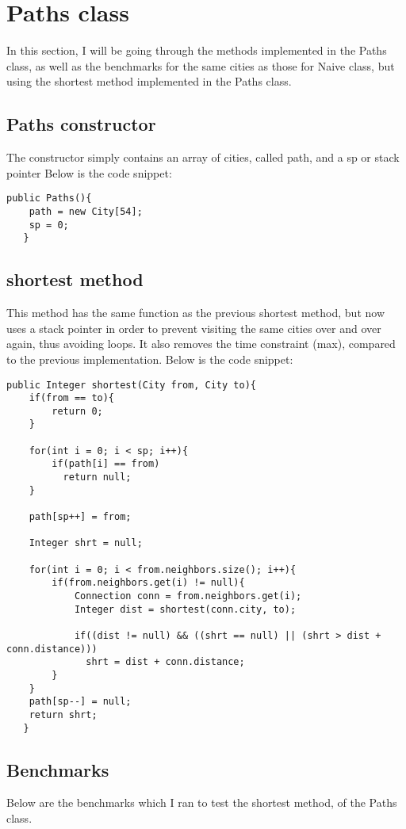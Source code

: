 \documentclass[a4paper,11pt]{article}
\begin{document}
\section*{Paths class}
In this section, I will be going through the methods implemented in the Paths class, as well as the benchmarks for the same cities as those for Naive class, but using the shortest method implemented in the Paths class.


\subsection*{Paths constructor}
The constructor simply contains an array of cities, called path, and a sp or stack pointer Below is the code snippet:

\begin{verbatim}
public Paths(){
    path = new City[54];
    sp = 0;
   }
\end{verbatim}

\subsection*{shortest method}
This method has the same function as the previous shortest method, but now uses a stack pointer in order to prevent visiting the same cities over and over again, thus avoiding loops. It also removes the time constraint (max), compared to the previous implementation. Below is the code snippet:

\begin{verbatim}
public Integer shortest(City from, City to){
    if(from == to){
        return 0;
    }

    for(int i = 0; i < sp; i++){
        if(path[i] == from)
          return null;
    }

    path[sp++] = from;

    Integer shrt = null;

    for(int i = 0; i < from.neighbors.size(); i++){
        if(from.neighbors.get(i) != null){
            Connection conn = from.neighbors.get(i);
            Integer dist = shortest(conn.city, to);

            if((dist != null) && ((shrt == null) || (shrt > dist + conn.distance)))
              shrt = dist + conn.distance;
        }
    }
    path[sp--] = null;
    return shrt;
   }
\end{verbatim}


\subsection*{Benchmarks}
Below are the benchmarks which I ran to test the shortest method, of the Paths class.
\end{document}
